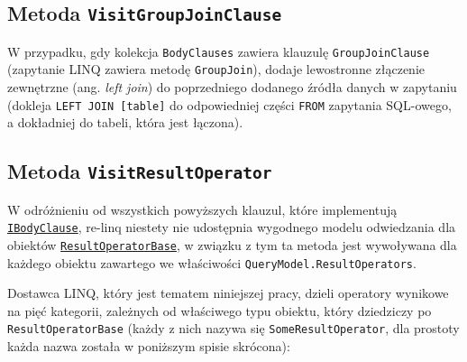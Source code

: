 \subsection{Metoda \texttt{VisitGroupJoinClause}}
W przypadku, gdy kolekcja \texttt{BodyClauses} zawiera klauzulę \texttt{GroupJoinClause} (zapytanie LINQ zawiera metodę \texttt{GroupJoin}), dodaje lewostronne złączenie zewnętrzne (ang. \textit{left join}) do poprzedniego dodanego źródła danych w zapytaniu (dokleja \texttt{LEFT JOIN [table]} do odpowiedniej części \texttt{FROM} zapytania SQL-owego, a dokładniej do tabeli, która jest łączona).

\subsection{Metoda \texttt{VisitResultOperator}}
W odróżnieniu od wszystkich powyższych klauzul, które implementują \linebreak \href{https://github.com/re-motion/Relinq/blob/82fdca6a4bfd942bb4a71dd20ab9c5af0aea0541/Core/Clauses/IBodyClause.cs}{\texttt{IBodyClause}}, re-linq niestety nie udostępnia wygodnego modelu odwiedzania dla obiektów \href{https://github.com/re-motion/Relinq/blob/82fdca6a4bfd942bb4a71dd20ab9c5af0aea0541/Core/Clauses/ResultOperatorBase.cs}{\texttt{ResultOperatorBase}}, w związku z tym ta metoda jest wywoływana dla każdego obiektu zawartego we właściwości \texttt{QueryModel.ResultOperators}.

Dostawca LINQ, który jest tematem niniejszej pracy, dzieli operatory wynikowe na pięć kategorii, zależnych od właściwego typu obiektu, który dziedziczy po \texttt{ResultOperatorBase} (każdy z nich nazywa się \texttt{SomeResultOperator}, dla prostoty każda nazwa została w poniższym spisie skrócona):

